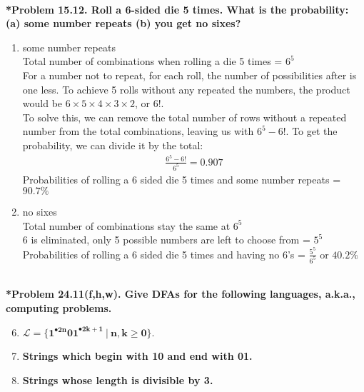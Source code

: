 \documentclass{article}
\begin{document}
    \noindent\\[0.25in]
    \noindent\textbf{*Problem 15.12. Roll a 6-sided die 5 times. What is the probability: (a) some number repeats (b) you get no sixes?}
    \begin{enumerate}[label=(\alph*)]
        \item some number repeats
        \\ Total number of combinations when rolling a die 5 times = $6^5$
        \\ For a number not to repeat, for each roll, the number of possibilities after is one less. To achieve 5 rolls without any repeated the numbers, the product would be $6 \times 5 \times 4 \times 3 \times 2$, or $6!$.
        \\ To solve this, we can remove the total number of rows without a repeated number from the total combinations, leaving us with $6^5 - 6!$. To get the probability, we can divide it by the total:
        \begin{align*}
            \frac{6^5 - 6!}{6^5} = 0.907
        \end{align*}
        Probabilities of rolling a 6 sided die 5 times and some number repeats = {\LARGE $\boxed{\mathbf{90.7\%}}$}
        
        \item no sixes
        \\ Total number of combinations stay the same at $6^5$
        \\ 6 is eliminated, only 5 possible numbers are left to choose from = $5^5$
        \\ Probabilities of rolling a 6 sided die 5 times and having no 6's = {\large $\frac{5^5}{6^5}$} or {\LARGE $\boxed{\mathbf{40.2\%}}$}
    \end{enumerate}

    \noindent\\[0.25in]
    \noindent\textbf{*Problem 24.11(f,h,w). Give DFAs for the following languages, a.k.a., computing problems.}
    \begin{enumerate}[label=(\alph*)]
        \setcounter{enumi}{5}
        \item $\mathbf{\mathcal{L}=\{1^{\bullet 2n}01^{\bullet 2k+1}\ |\ n,k\ge 0\}}$.
        \setcounter{enumi}{7}
        \item \textbf{Strings which begin with 10 and end with 01.}
        \setcounter{enumi}{22}
        \item \textbf{Strings whose length is divisible by 3.}
    \end{enumerate}
\end{document}
